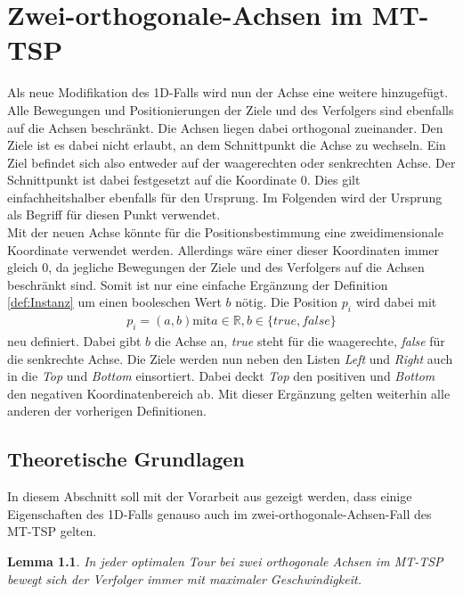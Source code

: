 \documentclass[german,version-2019-11]{uzl-thesis}
\newtheorem{lem}{Lemma}
\begin{document}
\chapter{Zwei-orthogonale-Achsen im MT-TSP}

Als neue Modifikation des 1D-Falls wird nun der Achse eine weitere hinzugefügt. Alle Bewegungen und Positionierungen der Ziele und des Verfolgers sind ebenfalls auf die Achsen beschränkt. Die Achsen liegen dabei orthogonal zueinander. Den Ziele ist es dabei nicht erlaubt, an dem Schnittpunkt die Achse zu wechseln. Ein Ziel befindet sich also entweder auf der waagerechten oder senkrechten Achse. Der Schnittpunkt ist dabei festgesetzt auf die Koordinate $0$. Dies gilt einfachheitshalber ebenfalls für den Ursprung. Im Folgenden wird der Ursprung als Begriff für diesen Punkt verwendet. \\
Mit der neuen Achse könnte für die Positionsbestimmung eine zweidimensionale Koordinate verwendet werden. Allerdings wäre einer dieser Koordinaten immer gleich $0$, da jegliche Bewegungen der Ziele und des Verfolgers auf die Achsen beschränkt sind. Somit ist nur eine einfache Ergänzung der Definition \ref{def:Instanz} um einen booleschen Wert $b$ nötig. Die Position $p_i$ wird dabei mit 
\begin{align*}
p_i = (a, b) \text{mit} a\in\mathbb{R}, b\in \{true, false\}
\end{align*}
neu definiert. Dabei gibt $b$ die Achse an, \emph{true} steht für die waagerechte, \emph{false} für die senkrechte Achse. Die Ziele werden nun neben den Listen \emph{Left} und \emph{Right} auch in die \emph{Top} und \emph{Bottom} einsortiert. Dabei deckt \emph{Top} den positiven und \emph{Bottom} den negativen Koordinatenbereich ab. Mit dieser Ergänzung gelten weiterhin alle anderen der vorherigen Definitionen.

\section{Theoretische Grundlagen}

In diesem Abschnitt soll mit der Vorarbeit aus \cite{helvig} gezeigt werden, dass einige Eigenschaften des 1D-Falls genauso auch im zwei-orthogonale-Achsen-Fall des MT-TSP gelten.

\begin{lem}
\label{lem:1}
In jeder optimalen Tour bei zwei orthogonale Achsen im MT-TSP bewegt sich der Verfolger immer mit maximaler Geschwindigkeit.
\end{lem}
 
\end{document}
